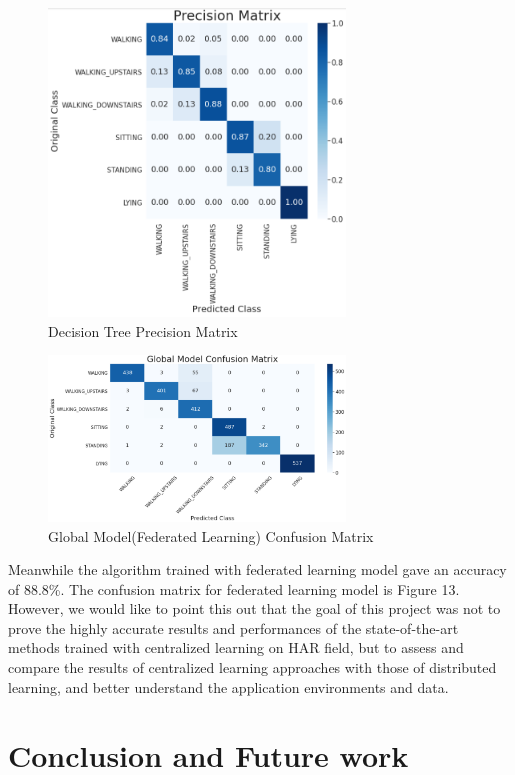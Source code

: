 \documentclass[12pt,conference]{IEEEtran}
\begin{document}
\begin{figure} [!t]
	\centering
	\includegraphics[width=3.1in]{tree_pm.PNG}
	\caption{Decision Tree Precision Matrix}
	\label{}
\end{figure}

\begin{figure} [!t]
	\centering
	\includegraphics[width=3.1in]{global_cm.PNG}
	\caption{Global Model(Federated Learning) Confusion Matrix}
	\label{}
\end{figure}

Meanwhile the algorithm trained with federated learning model gave an accuracy of 88.8\%. The confusion matrix for federated learning model is Figure 13. However, we would like to point this out that the goal of this project was not to prove the highly accurate results and performances of the state-of-the-art methods trained with centralized learning on HAR field, but to assess and compare the results of centralized learning approaches with those of distributed learning, and better understand the application environments and data.

\section{
\textbf{Conclusion and Future work}\label{sec:con}
}
\end{document}
